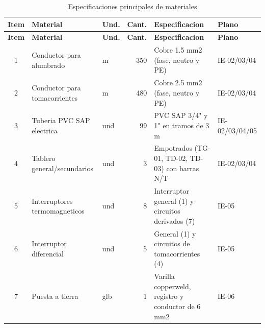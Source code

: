 \begin{landscape}
{\scriptsize
\setlength{\tabcolsep}{3pt}
\begin{longtable}{c L{3.0cm}L{1.0cm}r L{3.4cm}L{1.4cm}}
\caption{Especificaciones principales de materiales}\label{tab:especificaciones-materiales}\\
\toprule
\textbf{Item} & \textbf{Material} & \textbf{Und.} & \textbf{Cant.} & \textbf{Especificacion} & \textbf{Plano} \\
\midrule
\endfirsthead
\toprule
\textbf{Item} & \textbf{Material} & \textbf{Und.} & \textbf{Cant.} & \textbf{Especificacion} & \textbf{Plano} \\
\midrule
{} & Conductor para alumbrado & m & 350 & Cobre 1.5 mm2 (fase, neutro y PE) & IE-02/03/04 \\
2 & Conductor para tomacorrientes & m & 480 & Cobre 2.5 mm2 (fase, neutro y PE) & IE-02/03/04 \\
3 & Tuberia PVC SAP electrica & und & 99 & PVC SAP 3/4" y 1" en tramos de 3 m & IE-02/03/04/05 \\
4 & Tablero general/secundarios & und & 3 & Empotrados (TG-01, TD-02, TD-03) con barras N/T & IE-02/03/04 \\
5 & Interruptores termomagneticos & und & 8 & Interruptor general (1) y circuitos derivados (7) & IE-05 \\
6 & Interruptor diferencial & und & 5 & General (1) y circuitos de tomacorrientes (4) & IE-05 \\
7 & Puesta a tierra & glb & 1 & Varilla copperweld, registro y conductor de 6 mm2 & IE-06 \\
\bottomrule
\end{longtable}
}
\end{landscape}
